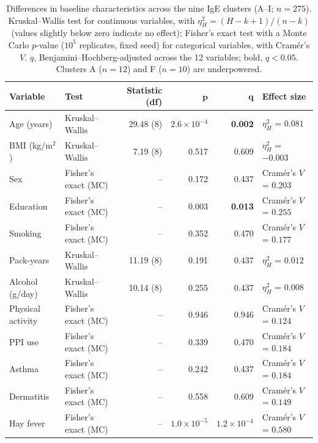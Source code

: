 \begin{table}[h!]
\centering
\small
\begin{tabular}{l l r r r l}
\textbf{Variable} & \textbf{Test} & \textbf{Statistic (df)} & $\boldsymbol{p}$ & $\boldsymbol{q}$ & \textbf{Effect size} \\
\hline
Age (years) & Kruskal--Wallis & 29.48 (8) & $2.6\times10^{-4}$ & \textbf{0.002} & $\eta^2_H$ = $0.081$ \\
BMI (kg/m$^2$) & Kruskal--Wallis & 7.19 (8) & 0.517 & 0.609 & $\eta^2_H$ = $-0.003$ \\
Sex & Fisher's exact (MC) & -- & 0.172 & 0.437 & Cram\'er's $V$ = $0.203$ \\
Education & Fisher's exact (MC) & -- & 0.003 & \textbf{0.013} & Cram\'er's $V$ = $0.255$ \\
Smoking & Fisher's exact (MC) & -- & 0.352 & 0.470 & Cram\'er's $V$ = $0.177$ \\
Pack-years & Kruskal--Wallis & 11.19 (8) & 0.191 & 0.437 & $\eta^2_H$ = $0.012$ \\
Alcohol (g/day) & Kruskal--Wallis & 10.14 (8) & 0.255 & 0.437 & $\eta^2_H$ = $0.008$ \\
Physical activity & Fisher's exact (MC) & -- & 0.946 & 0.946 & Cram\'er's $V$ = $0.124$ \\
PPI use & Fisher's exact (MC) & -- & 0.339 & 0.470 & Cram\'er's $V$ = $0.184$ \\
Asthma & Fisher's exact (MC) & -- & 0.242 & 0.437 & Cram\'er's $V$ = $0.184$ \\
Dermatitis & Fisher's exact (MC) & -- & 0.558 & 0.609 & Cram\'er's $V$ = $0.149$ \\
Hay fever & Fisher's exact (MC) & -- & $1.0\times10^{-5}$ & \textbf{$1.2\times10^{-4}$} & Cram\'er's $V$ = $0.580$ \\
\hline
\end{tabular}
\caption{Differences in baseline characteristics across the nine IgE clusters (A--I; $n = 275$). Kruskal--Wallis test for continuous variables, with $\eta^2_H = (H - k + 1)/(n - k)$ (values slightly below zero indicate no effect); Fisher's exact test with a Monte Carlo $p$-value ($10^5$ replicates, fixed seed) for categorical variables, with Cram\'er's $V$. $q$, Benjamini--Hochberg-adjusted across the 12 variables; bold, $q < 0.05$. Clusters A ($n = 12$) and F ($n = 10$) are underpowered.\label{tab:cluster_tests}}
\end{table}
